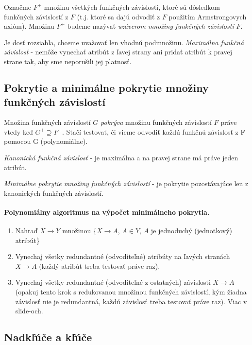 \documentclass[10pt,a4paper]{article}
\begin{document}
Označme $F^+$ množinu všetkých funkčných závislostí,
ktoré sú dôsledkom funkčných závislostí z $F$ (t.j. ktoré sa dajú
odvodiť z $F$ použitím Armstrongovych axióm). Množinu $F^+$ budeme
nazývať \emph{uzáverom množiny funkčných závislostí} $F$.

Je dosť rozsiahla, chceme uvažovať len vhodnú podmnožinu. 
\emph{Maximálna funkčná závislosť} - nemôže vynechať atribút z ľavej strany ani pridať atribút k pravej strane tak, aby sme neporušili jej platnosť. 

\subsection{Pokrytie a minimálne pokrytie množiny funkčných závislostí}
Množina funkčných závislostí $G$ \emph{pokrýva} množinu funkčných závislostí $F$ práve vtedy keď $G^+ \supseteq F^+$. 
Stačí testovať, či vieme odvodiť každú funkčnú závislosť z F pomocou G (polynomiálne).     

\emph{Kanonická funkčná závislosť} - je maximálna a na pravej strane má práve jeden atribút.     

\emph{Minimálne pokrytie množiny funkčných závislostí} - je pokrytie pozostávajúce len z kanonických funkčných závislostí. 

\paragraph{Polynomiálny algoritmus na výpočet minimálneho pokrytia.}
\begin{enumerate}
\item Nahraď $X \rightarrow Y$ množinou \{$X \rightarrow A$, $A \in Y$, $A$ je jednoduchý (jednotkový) atribút\}
\item Vynechaj všetky redundantné (odvoditeľné) atribúty na ľavých stranách
$X \rightarrow A$ (každý atribút treba testovať práve raz). 
\item Vynechaj všetky redundantné (odvoditeľné z ostatných) závislosti $X \rightarrow A$ (opakuj tento
krok s redukovanou množinou funkčných závislostí, kým
žiadna závislosť nie je redundantná, každú závislosť treba
testovať práve raz). Viac v slide-och. 

\end{enumerate}

\subsection{Nadkľúče a kľúče}
\end{document}
